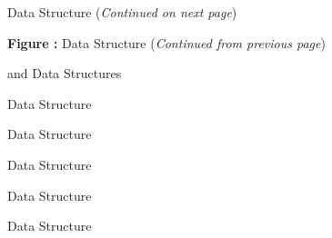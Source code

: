\clearpage
\begin{figure}[!htp]
\centering
\resizebox{\linewidth}{!}{}
\caption[ Data Structure]{ Data Structure (\textit{Continued on next page})}
\label{f:FlowEquationSet}
\end{figure}
\clearpage
\begin{figure}[!htp]
\centering
\resizebox{\linewidth}{!}{}
\par\vspace{\abovecaptionskip}
\textbf{Figure :}  Data Structure (\textit{Continued from previous page})
\end{figure}

\clearpage
\begin{figure}[!htp]
\centering
\resizebox{\linewidth}{!}{}
%
\caption{ and  Data Structures}
\label{f:FlowSolution}
\end{figure}

\clearpage
\begin{figure}[!htp]
\centering

\caption{ Data Structure}
\label{f:GasModel}
\end{figure}

\clearpage
\begin{figure}[!htp]
\centering

\caption{ Data Structure}
\label{f:GeometryReference}
\end{figure}

\clearpage
\begin{figure}[!htp]
\centering

\caption{ Data Structure}
\label{f:GoverningEquations}
\end{figure}

\clearpage
\begin{figure}[!htp]
\centering

\caption{ Data Structure}
\label{f:Gravity}
\end{figure}

\clearpage
\begin{figure}[!htp]
\centering
\resizebox{\linewidth}{!}{}
\caption{ Data Structure}
\label{f:GridConnectivity}
\end{figure}

